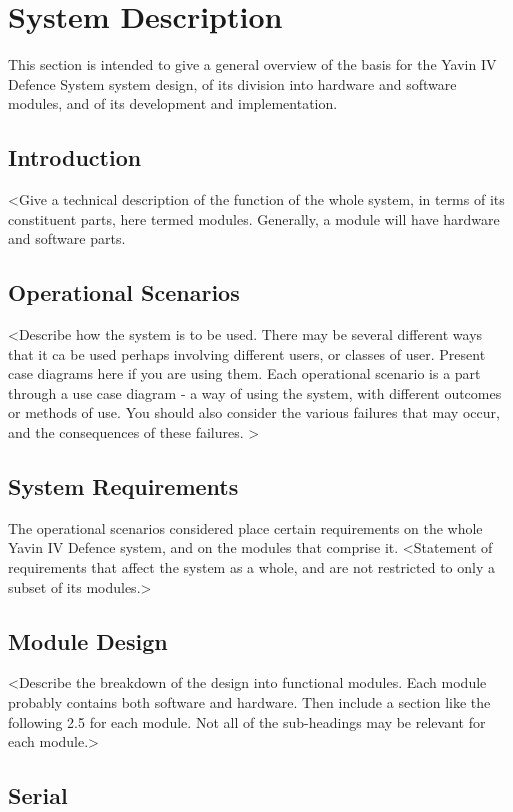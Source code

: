 \documentclass[]{report}
\begin{document}
\chapter{System Description}
This section is intended to give a general overview of the basis for the Yavin IV Defence System system design, of its division into hardware and software modules, and of its development and implementation.

\section{Introduction}
<Give a technical description of the function of the whole system, in terms of its constituent parts, here termed modules. Generally, a module will have hardware and software parts.

\section{Operational Scenarios}
<Describe how the system is to be used. There may be several different ways that it ca be used perhaps involving different users, or classes of user. Present case diagrams here if you are using them. Each operational scenario is a part through a use case diagram - a way of using the system, with different outcomes or methods of use. You should also consider the various failures that may occur, and the consequences of these failures. >

\section{System Requirements}
The operational scenarios considered place certain requirements on the whole Yavin IV Defence system, and on the modules that comprise it.
<Statement of requirements that affect the system as a whole, and are not restricted to only a subset of its modules.>

\section{Module Design}
<Describe the breakdown of the design into functional modules. Each module probably contains both software and hardware.
Then include a section like the following 2.5 for each module. Not all of the sub-headings may be relevant for each module.>


\section{Serial}
\end{document}
